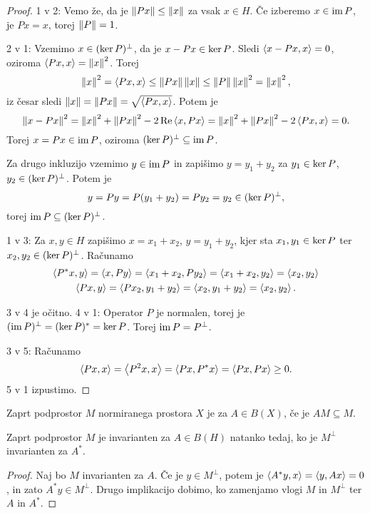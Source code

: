 \begin{proof}
  1 v 2:
  Vemo že, da je $\left\lVert Px\right\rVert \le \left\lVert x\right\rVert$ za vsak $x \in H$.
  Če izberemo $x \in \operatorname{im} P$, je $Px = x$, torej $\left\lVert P\right\rVert = 1$.

  2 v 1:
  Vzemimo $x \in (\operatorname{ker} P)^\bot$, da je $x - Px \in \operatorname{ker} P$.
  Sledi $\left< x - Px, x \right> = 0$, oziroma $\left< Px,x \right> = \left\lVert x\right\rVert^2$.
  Torej
  \[
	\left\lVert x\right\rVert^2 = \left< Px, x \right> \le \left\lVert Px\right\rVert \left\lVert x\right\rVert \le \left\lVert P\right\rVert \left\lVert x\right\rVert^2 =
	\left\lVert x\right\rVert^2,
  \]
  iz česar sledi $\left\lVert x\right\rVert = \left\lVert Px\right\rVert = \sqrt{\left< Px,x \right>}$.
  Potem je
  \[
	\left\lVert x - Px\right\rVert^2 = \left\lVert x\right\rVert^2 + \left\lVert Px\right\rVert^2 - 2 \operatorname{Re} \left< x, Px \right>
	= \left\lVert x\right\rVert^2 + \left\lVert Px\right\rVert^2 - 2 \left< Px,x \right> = 0.
  \]
  Torej $x = Px \in \operatorname{im} P$, oziroma $(\operatorname{ker} P)^\bot \subseteq \operatorname{im} P$.

  Za drugo inkluzijo vzemimo $y \in \operatorname{im} P$ in zapišimo $y = y_1 + y_2$ za $y_1
  \in \operatorname{ker} P$, $y_2 \in (\operatorname{ker} P)^\bot$.
  Potem je
  \[
	y = Py = P(y_1 + y_2) = P y_2 = y_2 \in (\operatorname{ker} P)^\bot,
  \]
  torej $\operatorname{im} P \subseteq (\operatorname{ker} P)^\bot$.

  1 v 3:
  Za $x, y \in H$ zapišimo $x = x_1 + x_2$, $y = y_1 + y_2$, kjer sta $x_1, y_1
  \in \operatorname{ker} P$ ter $x_2, y_2 \in (\operatorname{ker} P)^\bot$.
  Računamo
  \begin{gather*}
	\left< P^* x, y \right> = \left< x, Py \right> = \left< x_1 + x_2, P y_2 \right> = \left< x_1 + x_2, y_2 \right> =
	\left< x_2, y_2 \right> \\
	\left< Px, y \right> = \left< Px_2, y_1 + y_2 \right> = \left< x_2, y_1 + y_2 \right> = \left< x_2, y_2 \right>.
  \end{gather*}

  3 v 4 je očitno.
  4 v 1:
  Operator $P$ je normalen, torej je $(\operatorname{im} P)^\bot = (\operatorname{ker} P)^* = \operatorname{ker} P$.
  Torej $\operatorname{im} P = P^\bot$.

  3 v 5:
  Računamo
  \[
	\left< Px,x \right> = \left< P^2 x, x \right> = \left< Px, P^* x \right> = \left< Px, Px \right> \ge 0.
  \]
  5 v 1 izpustimo.
\end{proof}

\begin{definicija}
  Zaprt podprostor $M$ normiranega prostora $X$ je  za $A \in
  B(X)$, če je $AM \subseteq M$.
\end{definicija}

\begin{trditev}
  Zaprt podprostor $M$ je invarianten za $A \in B(H)$ natanko tedaj, ko je
  $M^\bot$ invarianten za $A^*$.
\end{trditev}

\begin{proof}
  Naj bo $M$ invarianten za $A$.
  Če je $y \in M^\bot$, potem je $\left< A^* y, x \right> = \left< y, Ax \right> = 0$, in zato $A^*
  y \in M^\bot$.
  Drugo implikacijo dobimo, ko zamenjamo vlogi $M$ in $M^\bot$ ter $A$ in $A^*$.
\end{proof}

